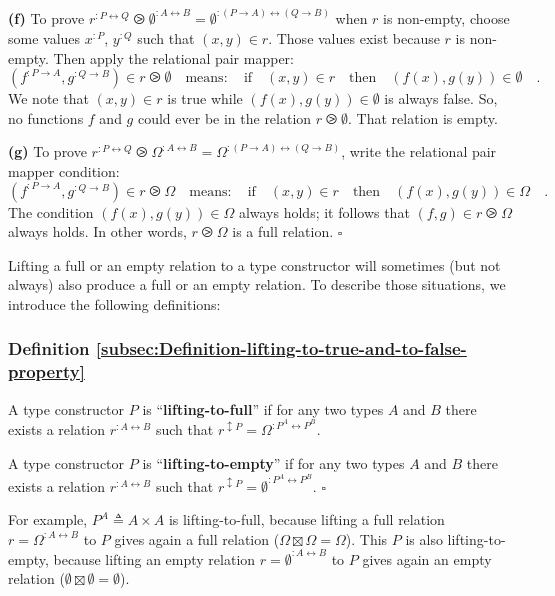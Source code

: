 \textbf{(f)} To prove $r^{:P\leftrightarrow Q}\ogreaterthan\emptyset^{:A\leftrightarrow B}=\emptyset^{:(P\rightarrow A)\leftrightarrow(Q\rightarrow B)}$
when $r$ is non-empty, choose some values $x^{:P}$, $y^{:Q}$ such
that $(x,y)\in r$. Those values exist because $r$ is non-empty.
Then apply the relational pair mapper:
\[
(f^{:P\rightarrow A},g^{:Q\rightarrow B})\in r\ogreaterthan\emptyset\quad\text{means}:\quad\text{if}\quad(x,y)\in r\quad\text{then}\quad(f(x),g(y))\in\emptyset\quad.
\]
We note that $(x,y)\in r$ is true while $(f(x),g(y))\in\emptyset$
is always false. So, no functions $f$ and $g$ could ever be in the
relation $r\ogreaterthan\emptyset$. That relation is empty.

\textbf{(g)} To prove $r^{:P\leftrightarrow Q}\ogreaterthan\Omega^{:A\leftrightarrow B}=\Omega^{:(P\rightarrow A)\leftrightarrow(Q\rightarrow B)}$,
write the relational pair mapper condition:
\[
(f^{:P\rightarrow A},g^{:Q\rightarrow B})\in r\ogreaterthan\Omega\quad\text{means}:\quad\text{if}\quad(x,y)\in r\quad\text{then}\quad(f(x),g(y))\in\Omega\quad.
\]
The condition $(f(x),g(y))\in\Omega$ always holds; it follows that
$(f,g)\in r\ogreaterthan\Omega$ always holds. In other words, $r\ogreaterthan\Omega$
is a full relation. $\square$

Lifting a full or an empty relation to a type constructor will sometimes
(but not always) also produce a full or an empty relation. To describe
those situations, we introduce the following definitions:

\subsubsection{Definition \label{subsec:Definition-lifting-to-true-and-to-false-property}\ref{subsec:Definition-lifting-to-true-and-to-false-property}}

A type constructor $P$ is \textsf{``}\textbf{lifting-to-full}\textsf{''}
if for any two types $A$ and $B$  there exists a relation $r^{:A\leftrightarrow B}$
such that $r^{\updownarrow P}=\Omega^{:P^{A}\leftrightarrow P^{B}}$.

A type constructor $P$ is \textsf{``}\textbf{lifting-to-empty}\textsf{''}
if for any two types $A$ and $B$ there exists a relation $r^{:A\leftrightarrow B}$
such that $r^{\updownarrow P}=\emptyset^{:P^{A}\leftrightarrow P^{B}}$.
$\square$

For example, $P^{A}\triangleq A\times A$ is lifting-to-full, because
lifting a full relation $r=\Omega^{:A\leftrightarrow B}$ to $P$
gives again a full relation ($\Omega\boxtimes\Omega=\Omega$). This
$P$ is also lifting-to-empty, because lifting an empty relation $r=\emptyset^{:A\leftrightarrow B}$
to $P$ gives again an empty relation ($\emptyset\boxtimes\emptyset=\emptyset$). 

